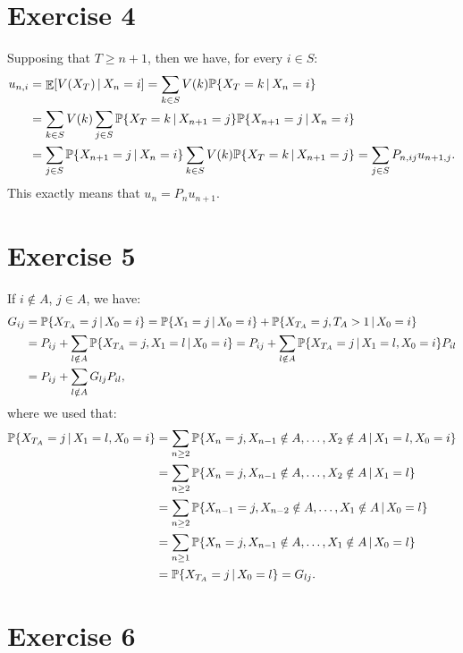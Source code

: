 \documentclass[a4paper,11pt]{article}
\theoremstyle{definition}
\theoremstyle{plain}
\theoremstyle{remark}
\DeclarePairedDelimiter{\parq}{[}{]}
\DeclarePairedDelimiter{\bra}{\lbrace}{\rbrace}
\DeclareMathOperator*{\expval}{\mathbb{E}}
\begin{document}
\section*{Exercise 4}

Supposing that $T\geq n+1$, then we have, for every $i\in S$:
\begin{align*}
u_{n,i} & = \expval\parq{V(X_T)\,|\,X_n=i} = \sum_{k\in S} V(k)\mathbb{P}\bra{X_T=k\,|\,X_n=i} \\ & = \sum_{k\in S} V(k)\sum_{j\in S}\mathbb{P}\bra{X_T=k\,|\,X_{n+1}=j}\mathbb{P}\bra{X_{n+1}=j\,|\,X_n=i} \\ & = \sum_{j\in S} \mathbb{P}\bra{X_{n+1}=j\,|\,X_n=i} \sum_{k\in S} V(k)\mathbb{P}\bra{X_T=k\,|\,X_{n+1}=j} = \sum_{j\in S} P_{n,ij}u_{n+1,j}.
\end{align*}
This exactly means that $u_n = P_nu_{n+1}$.

\section*{Exercise 5}

If $i\notin A$, $j\in A$, we have:
\begin{align*}
G_{ij} & = \mathbb{P}\bra{X_{T_A}=j\,|\,X_0=i} = \mathbb{P}\bra{X_1=j\,|\,X_0=i} + \mathbb{P}\bra{X_{T_A}=j,T_A>1\,|\,X_0=i} \\ & = P_{ij} + \sum_{l\notin A} \mathbb{P}\bra{X_{T_A}=j,X_1=l\,|\,X_0=i} = P_{ij} + \sum_{l\notin A} \mathbb{P}\bra{X_{T_A}=j\,|\,X_1=l,X_0=i}P_{il} \\ & = P_{ij} + \sum_{l\notin A} G_{lj}P_{il},
\end{align*}
where we used that:
\begin{align*}
\mathbb{P}\bra{X_{T_A}=j\,|\,X_1=l,X_0=i} & = \sum_{n\geq2} \mathbb{P}\bra{X_n=j,X_{n-1}\notin A,\dots,X_2\notin A\,|\,X_1=l,X_0=i} \\ & = \sum_{n\geq2} \mathbb{P}\bra{X_n=j,X_{n-1}\notin A,\dots,X_2\notin A\,|\,X_1=l}  \\ & = \sum_{n\geq2} \mathbb{P}\bra{X_{n-1}=j,X_{n-2}\notin A,\dots,X_1\notin A\,|\,X_0=l} \\ & = \sum_{n\geq1} \mathbb{P}\bra{X_n=j,X_{n-1}\notin A,\dots,X_1\notin A\,|\,X_0=l} \\ & = \mathbb{P}\bra{X_{T_A}=j\,|\,X_0=l} = G_{lj}.
\end{align*}

\section*{Exercise 6}
\end{document}
